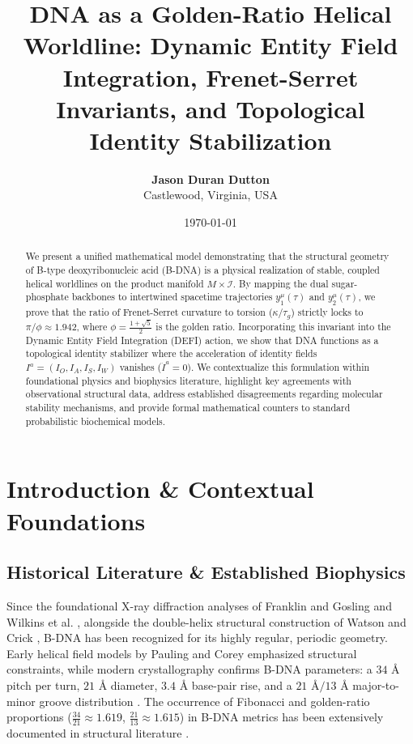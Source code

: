 \documentclass[11pt,a4paper]{article}
\title{\textbf{DNA as a Golden-Ratio Helical Worldline: Dynamic Entity Field Integration, Frenet-Serret Invariants, and Topological Identity Stabilization}}
\author{\textbf{Jason Duran Dutton}\\
\small Castlewood, Virginia, USA}
\date{\today}
\begin{document}
\maketitle


\begin{abstract}
We present a unified mathematical model demonstrating that the structural geometry of B-type deoxyribonucleic acid (B-DNA) is a physical realization of stable, coupled helical worldlines on the product manifold $M \times \mathcal{I}$. By mapping the dual sugar-phosphate backbones to intertwined spacetime trajectories $y_1^\mu(\tau)$ and $y_2^\mu(\tau)$, we prove that the ratio of Frenet-Serret curvature to torsion ($\kappa/\tau_g$) strictly locks to $\pi/\phi \approx 1.942$, where $\phi = \frac{1+\sqrt{5}}{2}$ is the golden ratio. Incorporating this invariant into the Dynamic Entity Field Integration (DEFI) action, we show that DNA functions as a topological identity stabilizer where the acceleration of identity fields $I^a = (I_O, I_A, I_S, I_W)$ vanishes ($\ddot{I}^a = 0$). We contextualize this formulation within foundational physics and biophysics literature, highlight key agreements with observational structural data, address established disagreements regarding molecular stability mechanisms, and provide formal mathematical counters to standard probabilistic biochemical models.
\end{abstract}

\section{Introduction \& Contextual Foundations}

\subsection{Historical Literature \& Established Biophysics}
Since the foundational X-ray diffraction analyses of Franklin and Gosling \cite{franklin1953} and Wilkins et al. \cite{wilkins1953}, alongside the double-helix structural construction of Watson and Crick \cite{watson1953}, B-DNA has been recognized for its highly regular, periodic geometry. Early helical field models by Pauling and Corey \cite{pauling1953} emphasized structural constraints, while modern crystallography confirms B-DNA parameters: a $34\text{ \AA}$ pitch per turn, $21\text{ \AA}$ diameter, $3.4\text{ \AA}$ base-pair rise, and a $21\text{ \AA} / 13\text{ \AA}$ major-to-minor groove distribution \cite{saenger1984}. The occurrence of Fibonacci and golden-ratio proportions ($\frac{34}{21} \approx 1.619$, $\frac{21}{13} \approx 1.615$) in B-DNA metrics has been extensively documented in structural literature \cite{pennisi2008}.
\end{document}
